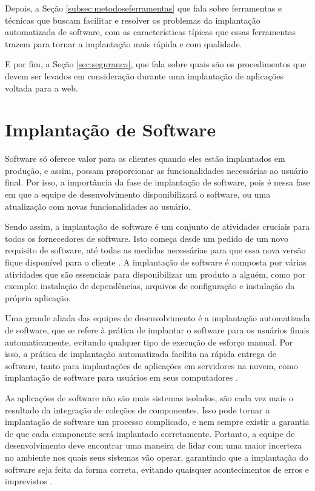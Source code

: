 Depois, a Seção \ref{subsec:metodoseferramentas} que fala sobre
ferramentas e técnicas que buscam facilitar e resolver os problemas da
implantação automatizada de software, com as características típicas que essas
ferramentas trazem para tornar a implantação mais rápida e com qualidade.

E por fim, a Seção \ref{sec:seguranca}, que fala sobre quais são os procedimentos 
que devem ser levados em consideração durante uma implantação de aplicações voltada
para a web.

\section{Implantação de Software}
\label{sec:implantacao}
Software só oferece valor para os clientes quando eles estão implantados em produção,
e assim, possam proporcionar as funcionalidades necessárias ao usuário final. Por
 isso, a importância da fase de implantação de software, pois é nessa fase em que a equipe
de desenvolvimento disponibilizará o software, ou uma atualização com novas funcionalidades
ao usuário. 

Sendo assim, a implantação de software é um conjunto de atividades cruciais
para todos os fornecedores de software. Isto começa desde um pedido de um novo requisito
de software, até todas as medidas necessárias para que essa nova versão fique disponível
para o cliente \cite{5741269}. A implantação de software é composta por várias
atividades que são essenciais para disponibilizar um produto a alguém, como por exemplo:
instalação de dependências, arquivos de configuração e instalação da própria aplicação.

Uma grande aliada das equipes de desenvolvimento é a implantação automatizada de
software, que se refere à prática de implantar o software para os usuários finais
automaticamente, evitando qualquer tipo de execução de esforço manual. Por isso,
a prática de implantação automatizada facilita na rápida entrega de software, tanto
para implantações de aplicações em servidores na nuvem, como implantação de software
para usuários em seus computadores \cite{7284592}.

As aplicações de software não são mais sistemas isolados, 
são cada vez mais o resultado da integração de coleções de
componentes. Isso pode tornar a implantação de software um processo complicado, e
nem sempre existir a garantia de que cada componente será implantado corretamente.
Portanto, a equipe de desenvolvimento deve encontrar uma maneira de lidar
com uma maior incerteza no ambiente nos quais seus sistemas vão operar, garantindo
que a implantação do software seja feita da forma correta, evitando quaisquer acontecimentos
de erros e imprevistos \cite{deployment1998}.


